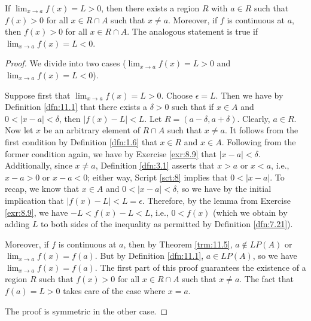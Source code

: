 \documentclass[../main.tex]{subfiles}
\begin{document}
\begin{lemma}\label{lem:11.8}
    If $\lim_{x\to a}f(x)=L>0$, then there exists a region $R$ with $a\in R$ such that $f(x)>0$ for all $x\in R\cap A$ such that $x\neq a$. Moreover, if $f$ is continuous at $a$, then $f(x)>0$ for all $x\in R\cap A$. The analogous statement is true if $\lim_{x\to a}f(x)=L<0$.
    \begin{proof}
        We divide into two cases ($\lim_{x\to a}f(x)=L>0$ and $\lim_{x\to a}f(x)=L<0$).\par\smallskip
        Suppose first that $\lim_{x\to a}f(x)=L>0$. Choose $\epsilon=L$. Then we have by Definition \ref{dfn:11.1} that there exists a $\delta>0$ such that if $x\in A$ and $0<|x-a|<\delta$, then $|f(x)-L|<L$. Let $R=(a-\delta,a+\delta)$. Clearly, $a\in R$. Now let $x$ be an arbitrary element of $R\cap A$ such that $x\neq a$. It follows from the first condition by Definition \ref{dfn:1.6} that $x\in R$ and $x\in A$. Following from the former condition again, we have by Exercise \ref{exr:8.9} that $|x-a|<\delta$. Additionally, since $x\neq a$, Definition \ref{dfn:3.1} asserts that $x>a$ or $x<a$, i.e., $x-a>0$ or $x-a<0$; either way, Script \ref{sct:8} implies that $0<|x-a|$. To recap, we know that $x\in A$ and $0<|x-a|<\delta$, so we have by the initial implication that $|f(x)-L|<L=\epsilon$. Therefore, by the lemma from Exercise \ref{exr:8.9}, we have $-L<f(x)-L<L$, i.e., $0<f(x)$ (which we obtain by adding $L$ to both sides of the inequality as permitted by Definition \ref{dfn:7.21}).\par
        Moreover, if $f$ is continuous at $a$, then by Theorem \ref{trm:11.5}, $a\notin LP(A)$ or $\lim_{x\to a}f(x)=f(a)$. But by Definition \ref{dfn:11.1}, $a\in LP(A)$, so we have $\lim_{x\to a}f(x)=f(a)$. The first part of this proof guarantees the existence of a region $R$ such that $f(x)>0$ for all $x\in R\cap A$ such that $x\neq a$. The fact that $f(a)=L>0$ takes care of the case where $x=a$.\par\smallskip
        The proof is symmetric in the other case.
    \end{proof}
\end{lemma}
\end{document}
